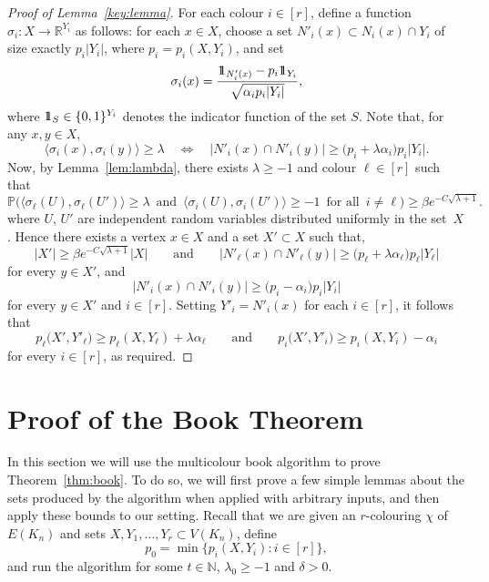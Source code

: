 \documentclass[12pt,reqno]{amsart}
\theoremstyle{definition}
\theoremstyle{remark}
\newcommand\N{\mathbb{N}}
\newcommand\R{\mathbb{R}}
\def\Pr{\mathbb{P}}
\newcommand\id{\hbox{$1\mkern-6.5mu1$}}
\renewcommand{\ge}{\geqslant}
\renewcommand{\to}{\rightarrow}
\def\R{\mathbb{R}}
\def\N{\mathbb{N}}
\begin{document}
\begin{proof}[Proof of Lemma~\ref{key:lemma}] 
For each colour $i \in [r]$, define a function $\sigma_i \colon X \to \R^{Y_i}$ as follows: for each $x \in X$, choose a set $N'_i(x) \subset N_i(x) \cap Y_i$ of size exactly $p_i|Y_i|$, where $p_i = p_i(X,Y_i)$, and set
$$\sigma_i(x) = \frac{\id_{N'_i(x)} - p_i\id_{Y_i}}{\sqrt{\alpha_ip_i|Y_i|}},$$
where $\id_S \in \{0,1\}^{Y_i}$ denotes the indicator function of the set $S$. Note that, for any $x,y\in X$,
$$\big\langle \sigma_i(x),\sigma_i(y) \big\rangle \ge \lambda \quad \Leftrightarrow \quad |N'_i(x) \cap N'_i(y)|\ge \big( p_i + \lambda\alpha_i \big) p_i |Y_i|.$$
Now, by Lemma~\ref{lem:lambda}, there exists $\lambda \ge -1$ and colour $\ell \in [r]$ such that
$$\Pr\Big( \big\langle \sigma_\ell(U),\sigma_\ell(U') \big\rangle \ge \lambda \, \text{ and } \, \big\langle \sigma_i(U), \sigma_i(U') \big\rangle \ge -1 \, \text{ for all } \, i \ne \ell \Big) \ge \beta e^{- C\sqrt{\lambda + 1}}.$$
where $U$, $U'$ are independent random variables distributed uniformly in the set~$X$. Hence there exists a vertex $x \in X$ and a set $X' \subset X$ such that, 
$$|X'| \ge \beta e^{- C \sqrt{\lambda + 1}} |X| \qquad \text{and} \qquad |N'_\ell(x) \cap N'_\ell(y)| \ge \big( p_\ell + \lambda\alpha_\ell \big) p_\ell |Y_\ell |$$
for every $y \in X'$, and
$$|N'_i(x) \cap N'_i(y)|\ge \big( p_i - \alpha_i \big) p_i |Y_i|$$
for every $y \in X'$ and $i \in [r]$. Setting $Y'_i = N'_i(x)$ for each $i \in [r]$, it follows that
$$p_\ell\big( X', Y'_\ell \big) \ge p_\ell(X,Y_\ell) + \lambda \alpha_\ell \qquad \text{and} \qquad p_i\big( X', Y'_i \big) \ge p_i(X,Y_i) - \alpha_i$$
for every $i \in [r]$, as required. 
\end{proof}


\section{Proof of the Book Theorem}\label{sec:book:proof}

In this section we will use the multicolour book algorithm to prove Theorem~\ref{thm:book}. To do so, we will first prove a few simple lemmas about the sets produced by the algorithm when applied with arbitrary inputs, and then apply these bounds to our setting. Recall that we are given an $r$-colouring $\chi$ of $E(K_n)$ and %
sets $X,Y_1,\ldots,Y_r \subset V(K_n)$, define 
\begin{equation}\label{def:p0}
p_0 = \min\big\{ p_i(X,Y_i) : i \in [r] \big\},
\end{equation}
and run the algorithm for some $t \in \N$, $\lambda_0 \ge -1$ and $\delta > 0$.
\end{document}
